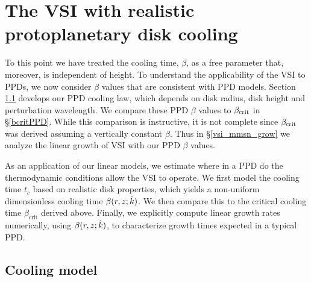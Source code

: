 \section{The VSI with realistic  protoplanetary disk cooling}\label{application} 
To this point we have treated the cooling time, $\beta$, as a free parameter that, moreover, is independent of height. 
To understand the applicability of the VSI to PPDs, we now consider $\beta$ values that are consistent with PPD models.
Section \ref{cooling_model}  develops our PPD cooling law, which depends on disk radius, disk height and perturbation wavelength.
We compare these PPD $\beta$ values to $\beta_{\rm crit}$ in \S\ref{bcritPPD}.  While this comparison is instructive, it is not complete since $\beta_{\rm crit}$ was derived assuming a vertically constant $\beta$.  Thus in \S\ref{vsi_mmsn_grow} we analyze the linear growth of VSI with our PPD $\beta$ values.

As an application of our linear models, we estimate where in a
PPD do the thermodynamic conditions allow the VSI to
operate. We first model the cooling time $t_c$ based on realistic
disk properties, which yields a non-uniform dimensionless cooling
time $\beta(r,z;\hat{k})$. We then compare this to the critical cooling time
$\beta_\mathrm{crit}$ derived above. Finally, we explicitly compute 
linear growth rates numerically, using $\beta(r,z;\hat{k})$, to
characterize growth times expected in a typical PPD.   


\subsection{Cooling model} \label{cooling_model}

